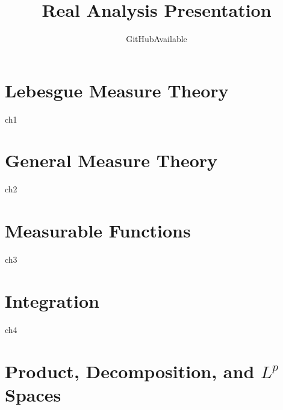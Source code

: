 \documentclass[openany]{book}
\title{Real Analysis Presentation}
\author{GitHubAvailable}
\begin{document}

\frontmatter  %

{
    \hypersetup{linkcolor=blue}
    \tableofcontents
}

\mainmatter  %

\chapter{Lebesgue Measure Theory}
{ch1}

\chapter{General Measure Theory}
{ch2}

\chapter{Measurable Functions}
{ch3}

\chapter{Integration}
{ch4}

\chapter{Product, Decomposition, and $L^p$ Spaces}
\end{document}

